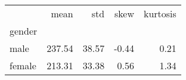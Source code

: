 \begin{tabular}{lrrrr}
\toprule
{} &    mean &    std &  skew &  kurtosis \\
gender &         &        &       &           \\
\midrule
male   &  237.54 &  38.57 & -0.44 &      0.21 \\
female &  213.31 &  33.38 &  0.56 &      1.34 \\
\bottomrule
\end{tabular}
